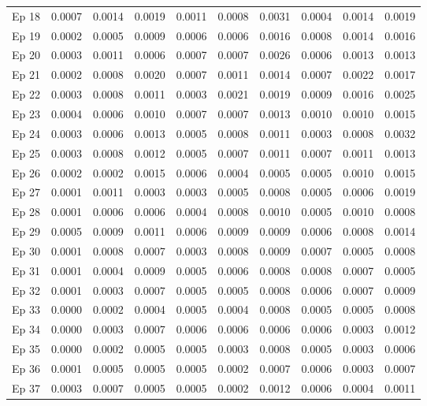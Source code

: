 \begin{table}[htbp]
\begin{tabular}{|l|l|l|l|l|l|l|l|l|l|}
Ep 18 & 0.0007 & 0.0014 & 0.0019 & 0.0011 & 0.0008 & 0.0031 & 0.0004 & 0.0014 & 0.0019  \\
Ep 19 & 0.0002 & 0.0005 & 0.0009 & 0.0006 & 0.0006 & 0.0016 & 0.0008 & 0.0014 & 0.0016  \\
Ep 20 & 0.0003 & 0.0011 & 0.0006 & 0.0007 & 0.0007 & 0.0026 & 0.0006 & 0.0013 & 0.0013  \\
Ep 21 & 0.0002 & 0.0008 & 0.0020 & 0.0007 & 0.0011 & 0.0014 & 0.0007 & 0.0022 & 0.0017  \\
Ep 22 & 0.0003 & 0.0008 & 0.0011 & 0.0003 & 0.0021 & 0.0019 & 0.0009 & 0.0016 & 0.0025  \\
Ep 23 & 0.0004 & 0.0006 & 0.0010 & 0.0007 & 0.0007 & 0.0013 & 0.0010 & 0.0010 & 0.0015  \\
Ep 24 & 0.0003 & 0.0006 & 0.0013 & 0.0005 & 0.0008 & 0.0011 & 0.0003 & 0.0008 & 0.0032  \\
Ep 25 & 0.0003 & 0.0008 & 0.0012 & 0.0005 & 0.0007 & 0.0011 & 0.0007 & 0.0011 & 0.0013  \\
Ep 26 & 0.0002 & 0.0002 & 0.0015 & 0.0006 & 0.0004 & 0.0005 & 0.0005 & 0.0010 & 0.0015  \\
Ep 27 & 0.0001 & 0.0011 & 0.0003 & 0.0003 & 0.0005 & 0.0008 & 0.0005 & 0.0006 & 0.0019  \\
Ep 28 & 0.0001 & 0.0006 & 0.0006 & 0.0004 & 0.0008 & 0.0010 & 0.0005 & 0.0010 & 0.0008  \\
Ep 29 & 0.0005 & 0.0009 & 0.0011 & 0.0006 & 0.0009 & 0.0009 & 0.0006 & 0.0008 & 0.0014  \\
Ep 30 & 0.0001 & 0.0008 & 0.0007 & 0.0003 & 0.0008 & 0.0009 & 0.0007 & 0.0005 & 0.0008  \\
Ep 31 & 0.0001 & 0.0004 & 0.0009 & 0.0005 & 0.0006 & 0.0008 & 0.0008 & 0.0007 & 0.0005  \\
Ep 32 & 0.0001 & 0.0003 & 0.0007 & 0.0005 & 0.0005 & 0.0008 & 0.0006 & 0.0007 & 0.0009  \\
Ep 33 & 0.0000 & 0.0002 & 0.0004 & 0.0005 & 0.0004 & 0.0008 & 0.0005 & 0.0005 & 0.0008  \\
Ep 34 & 0.0000 & 0.0003 & 0.0007 & 0.0006 & 0.0006 & 0.0006 & 0.0006 & 0.0003 & 0.0012  \\
Ep 35 & 0.0000 & 0.0002 & 0.0005 & 0.0005 & 0.0003 & 0.0008 & 0.0005 & 0.0003 & 0.0006  \\
Ep 36 & 0.0001 & 0.0005 & 0.0005 & 0.0005 & 0.0002 & 0.0007 & 0.0006 & 0.0003 & 0.0007  \\
Ep 37 & 0.0003 & 0.0007 & 0.0005 & 0.0005 & 0.0002 & 0.0012 & 0.0006 & 0.0004 & 0.0011  \\

\end{tabular}
\end{table}
